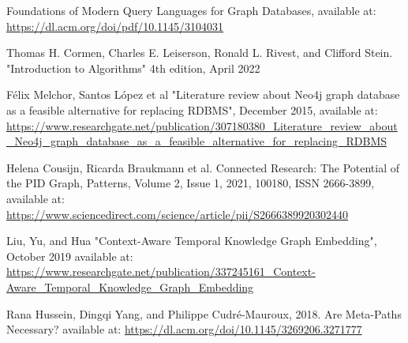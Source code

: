 \documentclass[conference]{IEEEtran}
\begin{document}
\begin{thebibliography}{00}
 Foundations of Modern Query Languages for Graph Databases, available at: \url{https://dl.acm.org/doi/pdf/10.1145/3104031}

 Thomas H. Cormen, Charles E. Leiserson, Ronald L. Rivest, and Clifford Stein. "Introduction to Algorithms" 4th edition, April 2022

Félix Melchor, Santos López et al "Literature review about Neo4j graph database as a feasible alternative for replacing RDBMS", December 2015, available at: \url{https://www.researchgate.net/publication/307180380_Literature_review_about_Neo4j_graph_database_as_a_feasible_alternative_for_replacing_RDBMS}

 Helena Cousijn, Ricarda Braukmann et al. Connected Research: The Potential of the PID Graph, Patterns, Volume 2, Issue 1, 2021, 100180, ISSN 2666-3899, available at: \url{https://www.sciencedirect.com/science/article/pii/S2666389920302440}

Liu, Yu, and Hua "Context-Aware Temporal Knowledge Graph Embedding", October 2019
available at: \url{https://www.researchgate.net/publication/337245161_Context-Aware_Temporal_Knowledge_Graph_Embedding}

Rana Hussein, Dingqi Yang, and Philippe Cudré-Mauroux, 2018. Are Meta-Paths Necessary? available at: \url{https://dl.acm.org/doi/10.1145/3269206.3271777}



\end{thebibliography}
\end{document}
